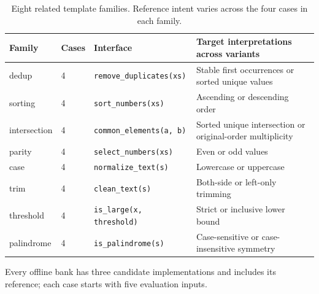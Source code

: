 \begin{table}[t]
\centering
\caption{Eight related template families. Reference intent varies across the four cases in each family.}
\label{tab:synthetic_families}
\footnotesize
\begin{tabularx}{\textwidth}{@{}llp{}X@{}}
\toprule
Family & Cases & Interface & Target interpretations across variants \\ \midrule
dedup & 4 & \texttt{remove\_duplicates(xs)} & Stable first occurrences or sorted unique values \\
sorting & 4 & \texttt{sort\_numbers(xs)} & Ascending or descending order \\
intersection & 4 & \texttt{common\_elements(a, b)} & Sorted unique intersection or original-order multiplicity \\
parity & 4 & \texttt{select\_numbers(xs)} & Even or odd values \\
case & 4 & \texttt{normalize\_text(s)} & Lowercase or uppercase \\
trim & 4 & \texttt{clean\_text(s)} & Both-side or left-only trimming \\
threshold & 4 & \texttt{is\_large(x, threshold)} & Strict or inclusive lower bound \\
palindrome & 4 & \texttt{is\_palindrome(s)} & Case-sensitive or case-insensitive symmetry \\
\bottomrule
\end{tabularx}
\par\smallskip Every offline bank has three candidate implementations and includes its reference; each case starts with five evaluation inputs.
\end{table}
